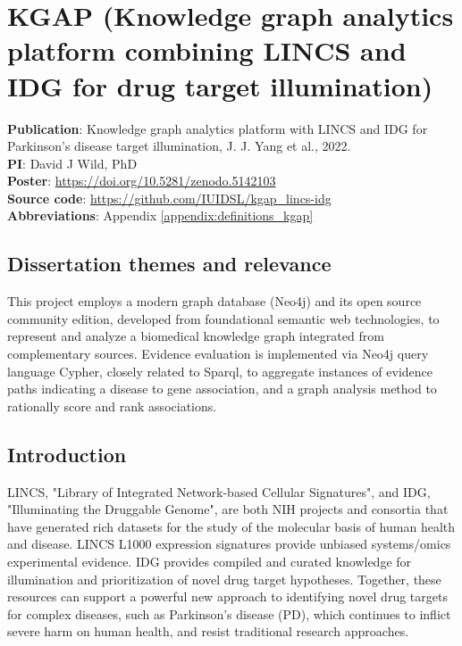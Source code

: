 \chapter{KGAP (Knowledge graph analytics platform combining LINCS and IDG for drug target illumination)}

\textbf{Publication}: Knowledge graph analytics platform with LINCS and IDG for Parkinson’s disease target illumination, J. J. Yang et al., 2022\cite{Yang2022-to}.\\
\textbf{PI}: David J Wild, PhD\\
\textbf{Poster}: \href{https://doi.org/10.5281/zenodo.5142103}{https://doi.org/10.5281/zenodo.5142103}\\
\textbf{Source code}: \href{https://github.com/IUIDSL/kgap\_lincs-idg}{https://github.com/IUIDSL/kgap\_lincs-idg}\\
\textbf{Abbreviations}: Appendix \ref{appendix:definitions_kgap}

\section{Dissertation themes and relevance}

This project employs a modern graph database (Neo4j) and its open source community edition, developed from foundational semantic web technologies, to represent and analyze a biomedical knowledge graph integrated from complementary sources. Evidence evaluation is implemented via Neo4j query language Cypher, closely related to Sparql, to aggregate instances of 
evidence paths indicating a disease to gene association, and a graph analysis method to rationally score and rank associations.

\section{Introduction}

LINCS, "Library of Integrated Network-based Cellular Signatures", and IDG, "Illuminating the Druggable Genome", are both NIH projects and consortia that have generated rich datasets for the study of the molecular basis of human health and disease.  LINCS L1000 expression signatures provide unbiased systems/omics experimental evidence. IDG provides compiled and curated knowledge for illumination and prioritization of novel drug target hypotheses. Together, these resources can support a powerful new approach to identifying novel drug targets for complex diseases, such as Parkinson's disease (PD), which continues to inflict severe harm on human health, and resist traditional research approaches.

